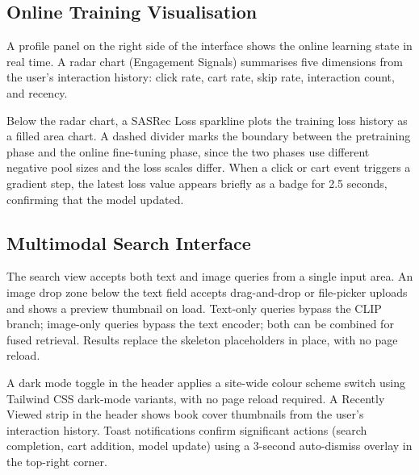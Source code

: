 \subsection{Online Training Visualisation}
\label{sec:training_viz}

A profile panel on the right side of the interface shows the online learning state in real time.
A radar chart (Engagement Signals) summarises five dimensions from the user's interaction history: click rate, cart rate, skip rate, interaction count, and recency.

Below the radar chart, a SASRec Loss sparkline plots the training loss history as a filled area chart.
A dashed divider marks the boundary between the pretraining phase and the online fine-tuning phase, since the two phases use different negative pool sizes and the loss scales differ.
When a click or cart event triggers a gradient step, the latest loss value appears briefly as a badge for 2.5 seconds, confirming that the model updated.

\subsection{Multimodal Search Interface}
\label{sec:multimodal_ui}

The search view accepts both text and image queries from a single input area.
An image drop zone below the text field accepts drag-and-drop or file-picker uploads and shows a preview thumbnail on load.
Text-only queries bypass the CLIP branch; image-only queries bypass the text encoder; both can be combined for fused retrieval.
Results replace the skeleton placeholders in place, with no page reload.

A dark mode toggle in the header applies a site-wide colour scheme switch using Tailwind CSS dark-mode variants, with no page reload required.
A Recently Viewed strip in the header shows book cover thumbnails from the user's interaction history.
Toast notifications confirm significant actions (search completion, cart addition, model update) using a 3-second auto-dismiss overlay in the top-right corner.
